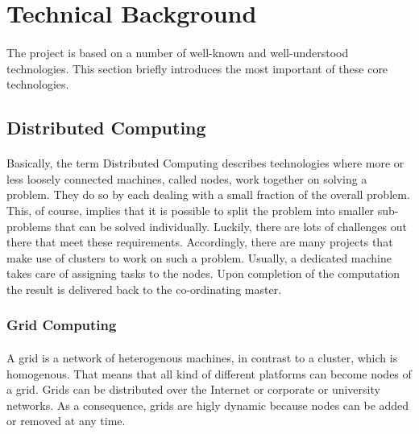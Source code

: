 \section{Technical Background}
\paragraph{}
The project is based on a number of well-known and well-understood technologies. This section briefly introduces the most important of these core technologies.

\subsection{Distributed Computing}
\paragraph{}
Basically, the term Distributed Computing describes technologies where more or less loosely connected machines, called nodes, work together on solving a problem. They do so by each dealing with a small fraction of the overall problem. This, of course, implies that it is possible to split the problem into smaller sub-problems that can be solved individually. Luckily, there are lots of challenges out there that meet these requirements. Accordingly, there are many projects that make use of clusters to work on such a problem. Usually, a dedicated machine takes care of assigning tasks to the nodes. Upon completion of the computation the result is delivered back to the co-ordinating master.


\subsubsection{Grid Computing}
\paragraph{}
A grid is a network of heterogenous machines, in contrast to a cluster, which is homogenous. That means that all kind of different platforms can become nodes of a grid. Grids can be distributed over the Internet or corporate or university networks. As a consequence, grids are higly dynamic because nodes can be added or removed at any time.

